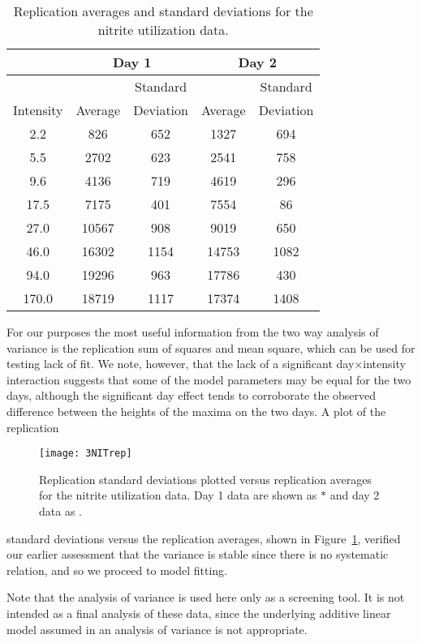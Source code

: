 \begin{table}
  \caption{
  Replication averages and standard deviations for the nitrite
  utilization data.}\label{tbl:3.3}
  \begin{center}
    \begin{tabular}{ccccc}\hline
      &\multicolumn{2}{c}{Day 1} & \multicolumn{2}{c}{Day 2}\\ \hline
      && \multicolumn{1}{c}{Standard} && \multicolumn{1}{c}{Standard}\\
      \multicolumn{1}{c}{Intensity}
      &\multicolumn{1}{c}{Average}&\multicolumn{1}{c}{Deviation} &
      \multicolumn{1}{c}{Average} & \multicolumn{1}{c}{Deviation}\\ \hline
      2.2&826&652&1327&694\\
      5.5&2702&623&2541&758\\
      9.6&4136&719&4619&296\\
      17.5&7175&401&7554&86\\
      27.0&10567&908&9019&650\\
      46.0&16302&1154&14753&1082\\
      94.0&19296&963&17786&430\\
      170.0&18719&1117&17374&1408\\ \hline
    \end{tabular}
  \end{center}
\end{table}
For our purposes the most useful information from the two way analysis
of variance is the replication sum of squares and mean square,
which can be used for testing lack of fit.
We note, however, that the lack of a significant
day$\times$intensity interaction suggests that some of the model parameters
may be equal for the two days, although the
significant day effect tends to corroborate the observed
difference between the heights of the maxima on the two days.
A plot of the replication
\begin{figure}
  \centerline{\texttt{[image: 3NITrep]}}%
  \caption{Replication standard deviations plotted versus replication
    averages for the nitrite utilization data.  Day 1 data are shown
    as $*$ and day 2 data as .}
  \label{fig:NITrep}
\end{figure}
standard deviations versus the replication averages, shown in
Figure~\ref{fig:NITrep}, verified our earlier assessment that the
variance is stable since there is no systematic relation,
and so we proceed to model fitting.

Note that the analysis of variance is used here only as a screening
tool.
It is not intended as a final analysis of these data, since the
underlying additive linear model assumed in an analysis of variance is
not appropriate.

